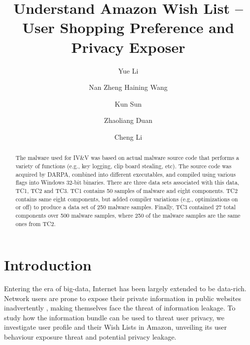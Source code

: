 \documentclass{llncs}
\begin{document}
\pagestyle{plain}
\title{Understand Amazon Wish List -- User Shopping Preference and Privacy Exposer}
%
%
\author{Yue Li \and Nan Zheng
Haining Wang \and Kun Sun\and Zhaoliang Duan \and Cheng Li}
%
%
%
\maketitle              %

\begin{abstract}
The malware used for IV\&V was based on actual malware source code that
performs a variety of functions (e.g., key logging, clip board stealing, etc). The
source code was acquired by DARPA, combined into different executables, and
compiled using various flags into Windows 32-bit binaries. There are three data
sets associated with this data, TC1, TC2 and TC3. TC1 contains 50 samples
of malware and eight components. TC2 contains same eight components, but
added compiler variations (e.g., optimizations on or off) to produce a data set
of 250 malware samples. Finally, TC3 contained 27 total components over 500
malware samples, where 250 of the malware samples are the same ones from
TC2.
\end{abstract}


\section{Introduction}
Entering the era of big-data, Internet has been largely extended to be data-rich. Network users are prone to expose their private information in public websites inadvertently \cite{frankowski2006you}, making themselves face the threat of information leakage. To study how the information bundle can be used to threat user privacy, we investigate user profile and their Wish Lists in Amazon, unveiling its user behaviour exposure threat and potential privacy leakage. 
\end{document}
